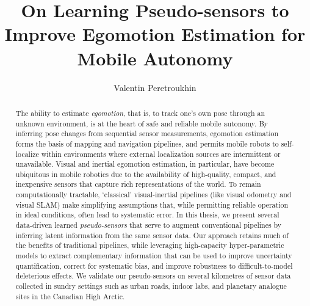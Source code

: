 \documentclass[oneandahalfspaced,twoside,12pt]{ut-thesis}
\author{Valentin Peretroukhin}
\title{On Learning Pseudo-sensors to Improve Egomotion Estimation for Mobile Autonomy}
\begin{document}
\begin{preliminary}

\maketitle


\begin{abstract}
The ability to estimate \textit{egomotion}, that is, to track one's own pose through an unknown environment, is at the heart of safe and reliable mobile autonomy. By inferring pose changes from sequential sensor measurements, egomotion estimation forms the basis of mapping and navigation pipelines, and permits mobile robots to self-localize within environments where external localization sources are intermittent or unavailable. 
Visual and inertial egomotion estimation, in particular, have become ubiquitous in mobile robotics due to the availability of high-quality, compact, and inexpensive sensors that capture rich representations of the world.
 To remain computationally tractable, `classical' visual-inertial pipelines (like visual odometry and visual SLAM) make simplifying assumptions that, while permitting reliable operation in ideal conditions, often lead to systematic error. In this thesis, we present several data-driven learned \textit{pseudo-sensors} that serve to augment conventional pipelines by inferring latent information from the same sensor data. Our approach retains much of the benefits of traditional pipelines, while leveraging high-capacity hyper-parametric models to extract complementary information that can be used to improve uncertainty quantification, correct for systematic bias, and improve robustness to difficult-to-model deleterious effects.
We validate our pseudo-sensors on several kilometres of sensor data collected in sundry settings such as urban roads, indoor labs, and planetary analogue sites in the Canadian High Arctic.
\end{abstract}


\end{preliminary}
\end{document}
